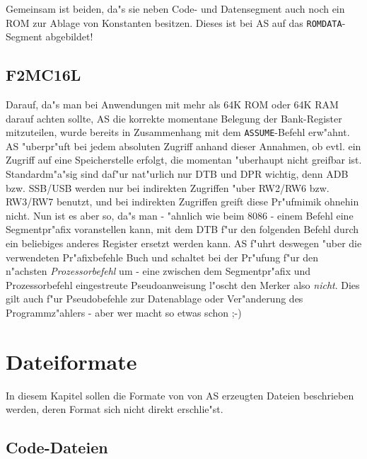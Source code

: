 \documentclass[12pt,a4paper,twoside]{report}
\newcommand{\tty}[1]{{\tt #1}}
\begin{document}
Gemeinsam ist beiden, da"s sie neben Code- und Datensegment auch noch ein
ROM zur Ablage von Konstanten besitzen.  Dieses ist bei AS auf das
\tty{ROMDATA}-Segment abgebildet!


\section{F2MC16L}

Darauf, da"s man bei Anwendungen mit mehr als 64K ROM oder 64K RAM darauf
achten sollte, AS die korrekte momentane Belegung der Bank-Register
mitzuteilen, wurde bereits in Zusammenhang mit dem {\tt ASSUME}-Befehl
erw"ahnt.  AS "uberpr"uft bei jedem absoluten Zugriff anhand dieser
Annahmen, ob evtl. ein Zugriff auf eine Speicherstelle erfolgt, die
momentan "uberhaupt nicht greifbar ist.  Standardm"a"sig sind daf"ur
nat"urlich nur DTB und DPR wichtig, denn ADB bzw. SSB/USB werden nur bei
indirekten Zugriffen "uber RW2/RW6 bzw. RW3/RW7 benutzt, und bei
indirekten Zugriffen greift diese Pr"ufmimik ohnehin nicht.  Nun ist es
aber so, da"s man - "ahnlich wie beim 8086 - einem Befehl eine
Segmentpr"afix voranstellen kann, mit dem DTB f"ur den folgenden Befehl
durch ein beliebiges anderes Register ersetzt werden kann.  AS f"uhrt
deswegen "uber die verwendeten Pr"afixbefehle Buch und schaltet bei der
Pr"ufung f"ur den n"achsten {\em Prozessorbefehl} um - eine zwischen dem
Segmentpr"afix und Prozessorbefehl eingestreute Pseudoanweisung l"oscht
den Merker also {\em nicht}.  Dies gilt auch f"ur Pseudobefehle zur
Datenablage oder Ver"anderung des Programmz"ahlers - aber wer macht so
etwas schon ;-)


\cleardoublepage
\chapter{Dateiformate}

In diesem Kapitel sollen die Formate von von AS erzeugten Dateien
beschrieben werden, deren Format sich nicht direkt erschlie"st.

\section{Code-Dateien}
\label{SectCodeFormat}
\end{document}
